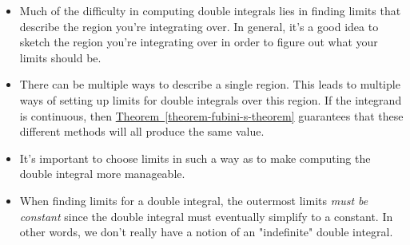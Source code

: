 \documentclass[10pt,]{book}
\numberwithin{equation}{section}
\begin{document}
\begin{itemize}[label=\textbullet]
\item{}Much of the difficulty in computing double integrals lies in finding limits that describe the region you're integrating over. In general, it's a good idea to sketch the region you're integrating over in order to figure out what your limits should be.%
\item{}There can be multiple ways to describe a single region. This leads to multiple ways of setting up limits for double integrals over this region. If the integrand is continuous, then \hyperref[theorem-fubini-s-theorem]{Theorem~\ref{theorem-fubini-s-theorem}} guarantees that these different methods will all produce the same value.%
\item{}It's important to choose limits in such a way as to make computing the double integral more manageable.%
\item{}When finding limits for a double integral, the outermost limits \emph{must be constant} since the double integral must eventually simplify to a constant. In other words, we don't really have a notion of an "indefinite" double integral.%
\end{itemize}
%
\end{document}
